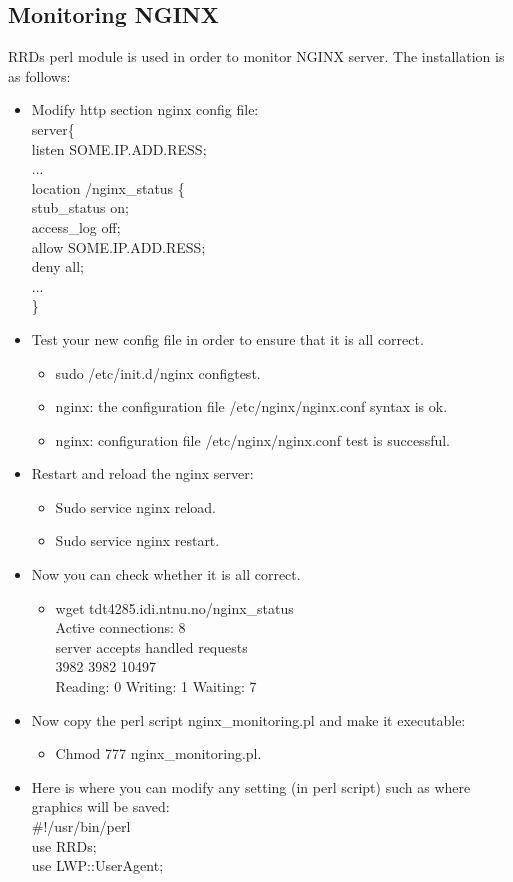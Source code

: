 \subsection{Monitoring NGINX}
RRDs perl module is used in order to monitor NGINX server. The installation is as follows:
\begin{itemize}
\item Modify http section nginx config file:\\
server\{ \\
listen SOME.IP.ADD.RESS;\\
... \\
location /nginx\_status \{ \\
stub\_status on; \\
access\_log off; \\
allow SOME.IP.ADD.RESS; \\
deny all; \\
... \\
\} \\
\item Test your new config file in order to ensure that it is all correct.
\begin{itemize}
\item sudo /etc/init.d/nginx configtest.
\item nginx: the configuration file /etc/nginx/nginx.conf syntax is ok.
\item nginx: configuration file /etc/nginx/nginx.conf test is successful.
\end{itemize}
\item Restart and reload the nginx server:
\begin{itemize}
\item Sudo service nginx reload.
\item Sudo service nginx restart.
\end{itemize}
\item Now you can check whether it is all correct.
\begin{itemize}
\item wget tdt4285.idi.ntnu.no/nginx\_status \\
Active connections: 8 \\
server accepts handled requests \\
 3982 3982 10497 \\
Reading: 0 Writing: 1 Waiting: 7 \\
\end{itemize}
\item Now copy the perl script nginx\_monitoring.pl and make it executable:
\begin{itemize}
\item Chmod 777 nginx\_monitoring.pl.
\end{itemize}
\item Here is where you can modify any setting (in perl script) such as where graphics will be saved: \\
\#!/usr/bin/perl \\
use RRDs; \\
use LWP::UserAgent; \\


\end{itemize}
